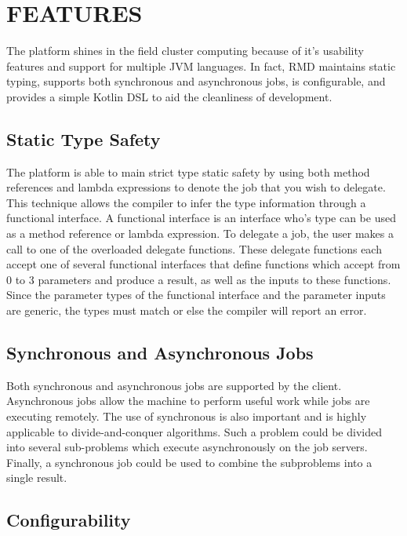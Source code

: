 \section{FEATURES}\label{sec:features}

The platform shines in the field cluster computing because of it's
usability features and support for multiple JVM languages.
In fact, RMD maintains static typing, supports both
synchronous and asynchronous jobs, is configurable, and provides
a simple Kotlin DSL to aid the cleanliness of development.

\subsection{Static Type Safety}\label{subsec:typeSafety}

The platform is able to main strict type static safety by using
both method references and lambda expressions to denote
the job that you wish to delegate.
This technique allows the compiler to infer the type
information through a functional interface.
A functional interface is an interface who's type
can be used as a method reference or lambda expression.
To delegate a job, the user makes a call to one of the overloaded
delegate functions.
These delegate functions each accept one of several functional
interfaces that define functions which accept from 0 to 3 parameters
and produce a result, as well as the inputs to these functions.
Since the parameter types of the functional interface and the parameter inputs
are generic, the types must match or else the compiler will report
an error.


\subsection{Synchronous and Asynchronous Jobs}\label{subsec:synchronousAndAsynchronousJobs}

Both synchronous and asynchronous jobs are supported by the client.
Asynchronous jobs allow the machine to perform useful work while jobs are executing remotely.
The use of synchronous is also important and is highly applicable to divide-and-conquer algorithms.
Such a problem could be divided into several sub-problems which execute asynchronously on the job servers.
Finally, a synchronous job could be used to combine the subproblems into a single result.


\subsection{Configurability}\label{subsec:configurability}

